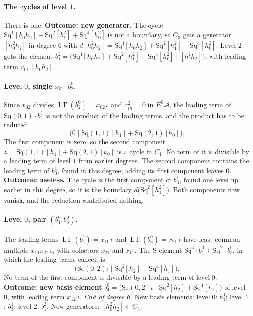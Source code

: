 \documentclass[11pt]{article}
\newcommand{\Sq}{\mathrm{Sq}}
\DeclareMathOperator{\LT}{LT}
\begin{document}
\paragraph{The cycles of level $1$.} There is one.
\textbf{Outcome: new generator.} The cycle $\Sq^{1}[h_0h_2] + \Sq^{2}[h_1^2] + \Sq^{4}[h_0^2]$ is not a boundary, so $C_{3}$ gets a generator $[h_0^2h_2]$ in degree $6$ with $d[h_0^2h_2] = \Sq^{1}[h_0h_2] + \Sq^{2}[h_1^2] + \Sq^{4}[h_0^2]$.
Level $2$ gets the element $b^{2}_{1} = \bigl(\Sq^{1}[h_0h_2] + \Sq^{2}[h_1^2] + \Sq^{4}[h_0^2] \;\big|\; [h_0^2h_2]\bigr)$, with leading term $x_{01}\,[h_0h_2]$.
\medskip
\paragraph{Level $0$, single $x_{02}\cdot b^{0}_{2}$.} Since $x_{02}$ divides $\LT(b^{0}_{2}) = x_{02}\,\iota$ and $x_{in}^2 = 0$ in $E^0\mathcal A$, the leading term of $\Sq(0,1)\cdot b^{0}_{2}$ is not the product of the leading terms, and the product has to be reduced:
\[\bigl(0 \;\big|\; \Sq(1,1)[h_1] + \Sq(2,1)[h_0]\bigr).\]
The first component is zero, so the second component $z = \Sq(1,1)[h_1] + \Sq(2,1)[h_0]$ is a cycle in $C_{1}$.
No term of it is divisible by a leading term of level $1$ from earlier degrees.
The second component contains the leading term of $b^{1}_{3}$, found in this degree; adding its first component leaves $0$.
\textbf{Outcome: useless.} The cycle is the first component of $b^{1}_{3}$, found one level up earlier in this degree, so it is the boundary $d\bigl(\Sq^{2}[h_1^2]\bigr)$. Both components now vanish, and the reduction contributed nothing.
\medskip
\paragraph{Level $0$, pair $(b^{0}_{1}, b^{0}_{3})$.} The leading terms $\LT(b^{0}_{1}) = x_{11}\,\iota$ and $\LT(b^{0}_{3}) = x_{21}\,\iota$ have least common multiple $x_{11}x_{21}\,\iota$, with cofactors $x_{21}$ and $x_{11}$. The S-element $\Sq^{4}\cdot b^{0}_{1} + \Sq^{2}\cdot b^{0}_{3}$, in which the leading terms cancel, is
\[\bigl(\Sq(0,2)\iota \;\big|\; \Sq^{2}[h_2] + \Sq^{4}[h_1]\bigr).\]
No term of the first component is divisible by a leading term of level $0$.
\textbf{Outcome: new basis element} $b^{0}_{4} = \bigl(\Sq(0,2)\iota \;\big|\; \Sq^{2}[h_2] + \Sq^{4}[h_1]\bigr)$ of level $0$, with leading term $x_{12}\,\iota$.
\medskip\noindent\emph{End of degree 6.} New basis elements: level $0$: $b^{0}_{4}$; level $1$: $b^{1}_{3}$; level $2$: $b^{2}_{1}$. New generators: $[h_0^2h_2]\in C_{3}$.
\end{document}
